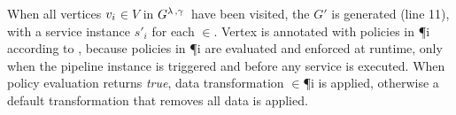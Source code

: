 When all vertices $v_{i}$$\in$$V$ in $G^{\lambda\,,\gamma\,}$ have been visited, the \pipelineInstance $G'$ is generated {\color{OurColor}(line 11)}, with a service instance $s'_i$ for each $\in$\Vp. Vertex  is annotated with policies in \P{i} according to \myLambda, because policies in \P{i} are evaluated and enforced at runtime, only when the pipeline instance is triggered and before any service is executed. When policy evaluation returns \emph{true}, data transformation \TP$\in$\P{i} is applied, otherwise a default transformation that removes all data is applied.










